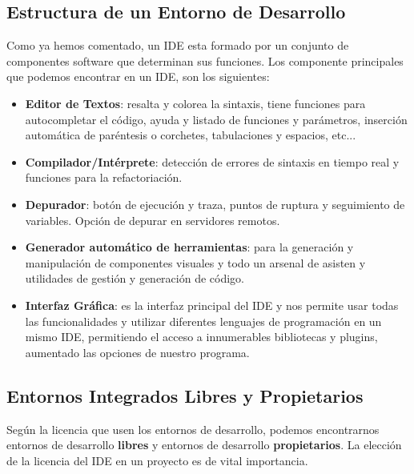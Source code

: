 \subsection{Estructura de un Entorno de Desarrollo}
Como ya hemos comentado, un IDE esta formado por un conjunto de componentes software que determinan sus funciones. Los componente principales que podemos encontrar en un IDE, son los siguientes:

\begin{itemize}
    \item \textbf{Editor de Textos}: resalta y colorea la sintaxis, tiene funciones para autocompletar el código, ayuda y listado de funciones y parámetros, inserción automática de paréntesis o corchetes, tabulaciones y espacios, etc...
    \item \textbf{Compilador/Intérprete}: detección de errores de sintaxis en tiempo real y funciones para la refactoriación.
    \item \textbf{Depurador}: botón de ejecución y traza, puntos de ruptura y seguimiento de variables. Opción de depurar en servidores remotos.
    \item \textbf{Generador automático de herramientas}: para la generación y manipulación de componentes visuales y todo un arsenal de asisten y utilidades de gestión y generación de código.
    \item \textbf{Interfaz Gráfica}: es la interfaz principal del IDE y nos permite usar todas las funcionalidades y utilizar diferentes lenguajes de programación en un mismo IDE, permitiendo el acceso a innumerables bibliotecas y plugins, aumentado las opciones de nuestro programa.
\end{itemize}

\subsection{Entornos Integrados Libres y Propietarios}
Según la licencia que usen los entornos de desarrollo, podemos encontrarnos entornos de desarrollo \textbf{libres} y entornos de desarrollo \textbf{propietarios}. La elección de la licencia del IDE en un proyecto es de vital importancia.

